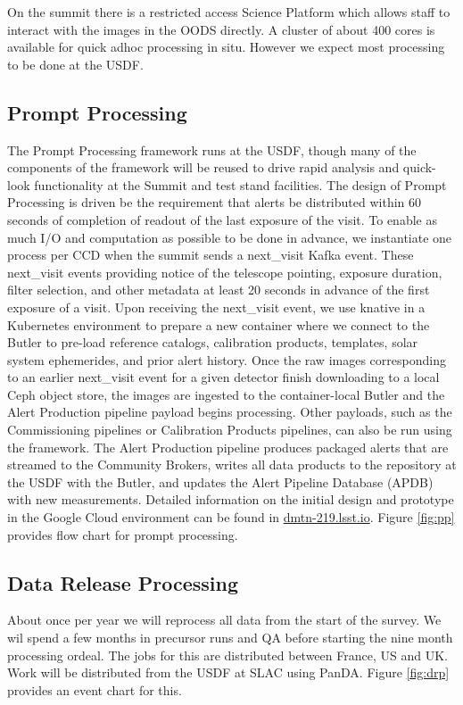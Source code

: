\documentclass[11pt,twoside]{article}
\begin{document}
On the summit there is a restricted access Science Platform which allows staff to interact with the  images in the OODS directly. A cluster of about 400 cores is available for quick adhoc processing in situ. However we expect most processing to be done at the USDF.

\subsection{Prompt Processing} \label{sec:prompt}
The Prompt Processing framework runs at the USDF, though many of the components of the framework will be reused to drive rapid analysis and quick-look functionality at the Summit and test stand facilities.
The design of Prompt Processing is driven be the requirement that alerts be distributed within 60 seconds of completion of readout of the last exposure of the visit.
To enable as much I/O and computation as possible to be done in advance, we instantiate one process per CCD when the summit sends a next\_visit Kafka event.
These next\_visit events providing notice of the telescope pointing, exposure duration, filter selection, and other metadata at least 20 seconds in advance of the first exposure of a visit.
Upon receiving the next\_visit event, we use knative in a Kubernetes environment to prepare a new container where we connect to the Butler to pre-load reference catalogs, calibration products, templates, solar system ephemerides, and prior alert history.
Once the raw images corresponding to an earlier next\_visit event for a given detector finish downloading to a local Ceph object store, the images are ingested to the container-local Butler and the Alert Production pipeline payload begins processing.
Other payloads, such as the Commissioning pipelines or Calibration Products pipelines, can also be run using the framework.
The Alert Production pipeline produces packaged alerts that are streamed to the Community Brokers, writes all data products to the repository at the USDF with the Butler, and updates the Alert Pipeline Database (APDB) with new measurements.
Detailed information on the initial design and prototype in the Google Cloud environment can be found in \url{dmtn-219.lsst.io}.
Figure \ref{fig:pp} provides flow chart for prompt processing.

\begin{centering}
\end{centering}

\subsection{Data Release Processing}\label{sec:DRP}
About once per year we will reprocess all data from the start of the survey.
We wil spend a few months in precursor runs and QA before starting the nine month processing ordeal.
The jobs for this are distributed between France, US and UK.
Work will be distributed from the USDF at SLAC using PanDA.
Figure \ref{fig:drp} provides an event chart for this.
\end{document}
